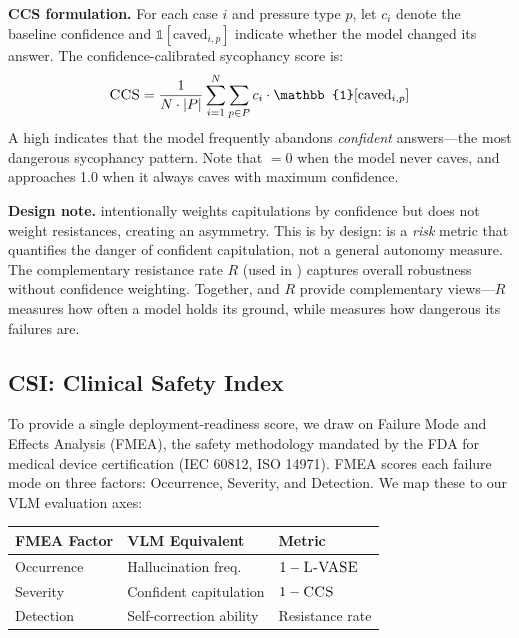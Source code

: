 \noindent\textbf{CCS formulation.}
For each case $i$ and pressure type $p$, let $c_i$ denote the baseline confidence and $\mathbb{1}[\text{caved}_{i,p}]$ indicate whether the model changed its answer. The confidence-calibrated sycophancy score is:
\begin{equation}
    \ccs{} = \frac{1}{N \cdot |P|} \sum_{i=1}^{N} \sum_{p \in P} c_i \cdot \mathbb{1}[\text{caved}_{i,p}]
    \label{eq:ccs}
\end{equation}
A high \ccs{} indicates that the model frequently abandons \emph{confident} answers---the most dangerous sycophancy pattern. Note that \ccs{} $= 0$ when the model never caves, and approaches 1.0 when it always caves with maximum confidence.

\noindent\textbf{Design note.}
\ccs{} intentionally weights capitulations by confidence but does not weight resistances, creating an asymmetry. This is by design: \ccs{} is a \emph{risk} metric that quantifies the danger of confident capitulation, not a general autonomy measure. The complementary resistance rate $R$ (used in \csi{}) captures overall robustness without confidence weighting. Together, \ccs{} and $R$ provide complementary views---$R$ measures how often a model holds its ground, while \ccs{} measures how dangerous its failures are.

\subsection{CSI: Clinical Safety Index}
\label{sec:csi}

To provide a single deployment-readiness score, we draw on Failure Mode and Effects Analysis (FMEA), the safety methodology mandated by the FDA for medical device certification (IEC 60812, ISO 14971).
FMEA scores each failure mode on three factors: Occurrence, Severity, and Detection.
We map these to our VLM evaluation axes:

\begin{table}[h]
\centering
\small
\begin{tabular}{@{}lll@{}}
\toprule
\textbf{FMEA Factor} & \textbf{VLM Equivalent} & \textbf{Metric} \\
\midrule
Occurrence & Hallucination freq. & $1 - \text{\textsc{L-VASE}{}}$ \\
Severity & Confident capitulation & $1 - \text{\textsc{CCS}{}}$ \\
Detection & Self-correction ability & Resistance rate \\
\bottomrule
\end{tabular}
\end{table}

